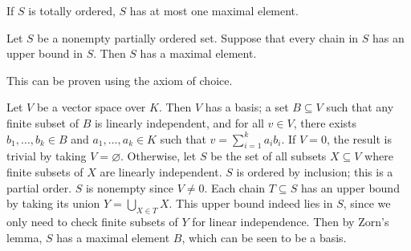 If \( S \) is totally ordered, \( S \) has at most one maximal element.
\begin{lemma}[Zorn]
	Let \( S \) be a nonempty partially ordered set.
	Suppose that every chain in \( S \) has an upper bound in \( S \).
	Then \( S \) has a maximal element.
\end{lemma}
This can be proven using the axiom of choice.
\begin{example}
	Let \( V \) be a vector space over \( K \).
	Then \( V \) has a basis; a set \( B \subseteq V \) such that any finite subset of \( B \) is linearly independent, and for all \( v \in V \), there exists \( b_1, \dots, b_k \in B \) and \( a_1, \dots, a_k \in K \) such that \( v = \sum_{i=1}^k a_i b_i \).
	If \( V = \qty{0} \), the result is trivial by taking \( V = \varnothing \).
	Otherwise, let \( S \) be the set of all subsets \( X \subseteq V \) where finite subsets of \( X \) are linearly independent.
	\( S \) is ordered by inclusion; this is a partial order.
	\( S \) is nonempty since \( V \neq \qty{0} \).
	Each chain \( T \subseteq S \) has an upper bound by taking its union \( Y = \bigcup_{X \in T} X \).
	This upper bound indeed lies in \( S \), since we only need to check finite subsets of \( Y \) for linear independence.
	Then by Zorn's lemma, \( S \) has a maximal element \( B \), which can be seen to be a basis.
\end{example}
